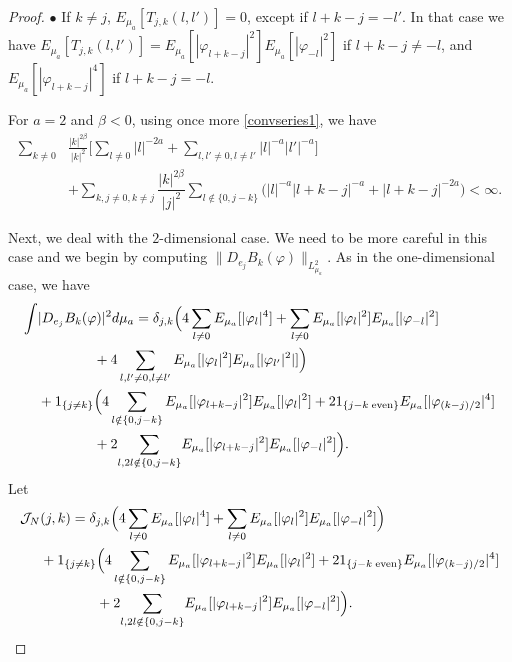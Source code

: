 \documentclass[11pt,leqno]{amsart}
\begin{document}
\begin{proof}
\indent $\bullet$ If $k\neq j$, $E_{\mu_a}[T_{j,k}(l,l')]=0$, except if $ l+k-j=-l'$. In that case we have
$E_{\mu_a}[T_{j,k}(l,l')] = E_{\mu_a} [|\varphi_{l+k-j}|^2] E_{\mu_a} [|\varphi_{-l}|^2]$ if $l+k-j\neq -l$, and $E_{\mu_a} [|\varphi_{l+k-j}|^4]$ if
$l+k-j=  -l$. 
\bigskip

 For $a=2$ and $\beta <0$, using once more \eqref{convseries1}, 
  we have 
\begin{align*}
\sum_{k\neq 0} &\frac{|k|^{2\beta}}{|k|^2} \Big[ \sum_{l\neq 0} |l|^{-2a} + \sum_{l,l' \neq 0, l\neq l'} |l|^{-a} |l'|^{-a} \Big] \\
& + 
 \sum_{k,j\neq 0, k\neq j} \dfrac{|k|^{2\beta}}{|j|^{2}}  \sum_{l\notin \{0, j-k\}}\big(  |l|^{-a}|l+k-j|^{-a} +
 |l+k-j|^{-2a}\big) <\infty.
\end{align*} 



Next, we deal with the $2$-dimensional case. We need to be more careful in this case and we begin by computing $\|D_{e_j} B_k (\varphi)\|_{L^2_{\mu_a}}$. As in the one-dimensional case, we have
\begin{align*}
\int & |D_{e_j}B_k(\varphi)|^2 d\mu_a =   \delta_{j,k} \Big(  4 \sum_{l\neq 0}  E_{\mu_a}[|\varphi_l|^4] + \sum_{l\neq 0} E_{\mu_a}[|\varphi_l|^2]  E_{\mu_a}[|\varphi_{-l}|^2]\\
& \qquad \qquad + 4 \sum_{l,l'\neq 0, l\neq l'} E_{\mu_a} [|\varphi_l|^2] E_{\mu_a} [|\varphi_{l'}|^2|] \Big)\\
& + 1_{\{j\neq k\} } \Big( 4 \sum_{l  \notin \{0, j-k\} } E_{\mu_a}[ |\varphi_{l+k-j}|^2]  E_{\mu_a}[ |\varphi_l|^2]  +2 1_{\{ j-k \; {\rm even}\}} E_{\mu_a} [ |\varphi_{(k-j)/2}|^4]  \\
& \qquad \qquad +2  { \sum_{l,2l \notin \{0, j-k\}} } E_{\mu_a}[ |\varphi_{l+k-j}|^2]  E_{\mu_a}[ |\varphi_{-l}|^2] \Big).
\end{align*}
Let 
\begin{align*}
 {\mathcal J}_N&(j,k)= \delta_{j,k} \Big(  4 \sum_{l\neq 0}  E_{\mu_a}[|\varphi_l|^4] + \sum_{l\neq 0} E_{\mu_a}[|\varphi_l|^2]  E_{\mu_a}[|\varphi_{-l}|^2] \Big) \\
&+  1_{\{j\neq k\} }\Big(  4 \sum_{l  \notin \{0, j-k\} } E_{\mu_a}[ |\varphi_{l+k-j}|^2]  E_{\mu_a}[ |\varphi_l|^2]  +2 1_{\{ j-k \; {\rm even}\}} E_{\mu_a} [ |\varphi_{(k-j)/2}|^4]  \\
& \qquad \qquad +2 {  \sum_{l,2l \notin \{0, j-k\}} } E_{\mu_a}[ |\varphi_{l+k-j}|^2]  E_{\mu_a}[ |\varphi_{-l}|^2] \Big).
\end{align*}



\end{proof}
\end{document}
